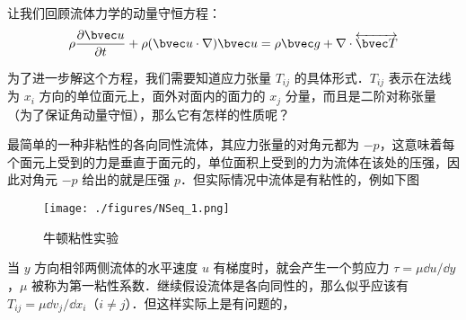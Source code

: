
让我们回顾流体力学的动量守恒方程：
\begin{equation}
\rho \frac{\partial \bvec u}{\partial t}+\rho(\bvec u\cdot \nabla)\bvec u=\rho \bvec g+\nabla\cdot \overleftrightarrow {\bvec T}
\end{equation}

为了进一步解这个方程，我们需要知道应力张量 $T_{ij}$ 的具体形式．$T_{ij}$ 表示在法线为 $x_i$ 方向的单位面元上，面外对面内的面力的 $x_j$ 分量，而且是二阶对称张量（为了保证角动量守恒），那么它有怎样的性质呢？

最简单的一种非粘性的各向同性流体，其应力张量的对角元都为 $-p$，这意味着每个面元上受到的力是垂直于面元的，单位面积上受到的力为流体在该处的压强，因此对角元 $-p$ 给出的就是压强 $p$．但实际情况中流体是有粘性的，例如下图
\begin{figure}[ht]
\centering
\texttt{[image: ./figures/NSeq\_1.png]}
\caption{牛顿粘性实验} \label{NSeq_fig1}
\end{figure}
当 $y$ 方向相邻两侧流体的水平速度 $u$ 有梯度时，就会产生一个剪应力 $\tau=\mu \dd u/\dd y$，$\mu$ 被称为第一粘性系数．继续假设流体是各向同性的，那么似乎应该有 $T_{ij}=\mu \dd v_j/\dd x_i$（$i\neq j$）．但这样实际上是有问题的，